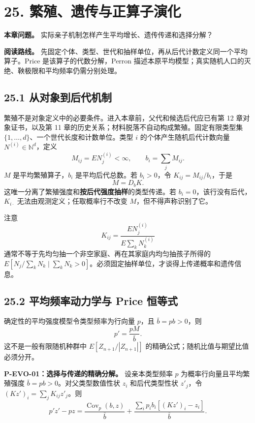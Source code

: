 \documentclass[
  11pt,
  oneside]{book}
\begin{document}
\chapter{25. 繁殖、遗传与正算子演化}\label{ch-25}

\textbf{本章问题。} 实际亲子机制怎样产生平均增长、遗传传递和选择分解？

\textbf{阅读路线。} 先固定个体、类型、世代和抽样单位，再从后代计数定义同一个平均算子。Price 是该算子的代数分解，Perron 描述本原平均模型；真实随机人口的灭绝、鞅极限和平均频率仍需分别处理。

\section{25.1 从对象到后代机制}\label{ux4eceux5bf9ux8c61ux5230ux540eux4ee3ux673aux5236}

繁殖不是对象定义中的必要条件。进入本章前，父代和候选后代应已有第 12 章对象证书，以及第 11 章的历史关系；材料脱落不自动构成繁殖。固定有限类型集 \(\{1,\ldots,d\}\)、一个世代长度和计数单位。类型 \(i\) 的个体产生随机后代计数向量 \(N^{(i)}\in\mathbb N^d\)，定义 \[M_{ij}=E N_j^{(i)}<\infty,\qquad b_i=\sum_jM_{ij}.\] \(M\) 是平均繁殖算子，\(b_i\) 是平均后代总数。若 \(b_i>0\)，令 \(K_{ij}=M_{ij}/b_i\)，于是 \[M=D_bK.\] 这唯一分离了繁殖强度和\textbf{按后代强度抽样}的类型传递。若 \(b_i=0\)，该行没有后代，\(K_{i\cdot}\) 无法由观测定义；任取概率行不改变 \(M\)，但不得声称识别了它。

注意 \[K_{ij}=\frac{EN_j^{(i)}}{E\sum_kN_k^{(i)}}\] 通常不等于先均匀抽一个非空家庭、再在其家庭内均匀抽孩子所得的 \(E[N_j/\sum_kN_k\mid\sum_kN_k>0]\)。必须固定抽样单位，才谈得上传递概率和遗传信息。

\section{25.2 平均频率动力学与 Price 恒等式}\label{ux5e73ux5747ux9891ux7387ux52a8ux529bux5b66ux4e0e-price-ux6052ux7b49ux5f0f}

确定性的平均强度模型令类型频率为行向量 \(p\)，且 \(\bar b=pb>0\)，则 \[p'=\frac{pM}{\bar b}.\] 这不是一般有限随机种群中 \(E[Z_{n+1}/|Z_{n+1}|]\) 的精确公式；随机比值与期望比值必须分开。

\hypertarget{p-evo-01}{}\label{p-evo-01}

\textbf{P-EVO-01：选择与传递的精确分解。} 设亲本类型频率 \(p\) 为概率行向量且平均繁殖强度 \(\bar b=pb>0\)。对父类型数值性状 \(z_i\) 和后代类型性状 \(z'_j\)，令 \((Kz')_i=\sum_jK_{ij}z'_j\)。则 \[p'z'-pz=
\frac{\operatorname{Cov}_p(b,z)}{\bar b}
+\frac{\sum_i p_ib_i[(Kz')_i-z_i]}{\bar b}.\]
\end{document}

